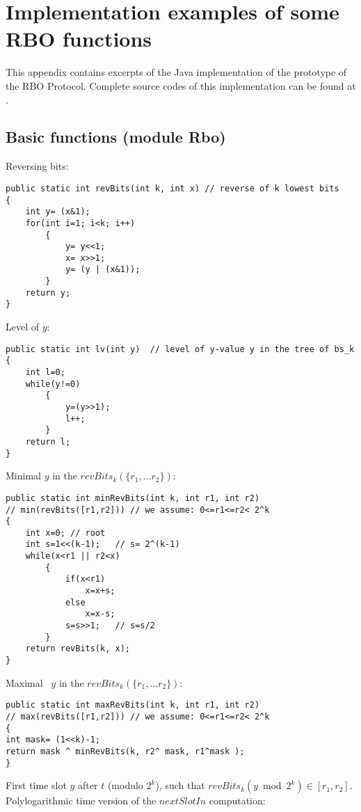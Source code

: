 \appendix

\section{Implementation examples of some RBO functions}
\label{}
This appendix contains excerpts of the Java implementation of the
prototype of the RBO Protocol.
Complete source codes of this implementation can
be found at \cite{RBO-WWW}.
\subsection{Basic functions (module Rbo)}
\label{Rbo-Java}
Reversing bits:
\begin{verbatim}
public static int revBits(int k, int x) // reverse of k lowest bits
{
    int y= (x&1);
    for(int i=1; i<k; i++)
        {
            y= y<<1;
            x= x>>1;
            y= (y | (x&1));
        }
    return y;
}
\end{verbatim}
Level of $y$:
\begin{verbatim}
public static int lv(int y)  // level of y-value y in the tree of bs_k
{
    int l=0;
    while(y!=0) 
        {
            y=(y>>1);
            l++;
        }
    return l;
}
\end{verbatim}
Minimal $y$ in the $revBits_k(\{r_1,\ldots r_2\})$:
\begin{verbatim}
public static int minRevBits(int k, int r1, int r2)
// min(revBits([r1,r2])) // we assume: 0<=r1<=r2< 2^k
{
    int x=0; // root
    int s=1<<(k-1);   // s= 2^(k-1)
    while(x<r1 || r2<x)
        {
            if(x<r1)
                x=x+s;
            else
                x=x-s;
            s=s>>1;   // s=s/2
        }
    return revBits(k, x);
}
\end{verbatim}
Maximal \ $y$ in the $revBits_k(\{r_1,\ldots r_2\})$:
\begin{verbatim}
public static int maxRevBits(int k, int r1, int r2)
// max(revBits([r1,r2])) // we assume: 0<=r1<=r2< 2^k
{
int mask= (1<<k)-1;
return mask ^ minRevBits(k, r2^ mask, r1^mask );
}
\end{verbatim}
First time slot $y$ after $t$ (modulo $2^k$), 
such that $revBits_k(y\bmod 2^k) \in [r_1, r_2]$.
Polylogarithmic time version of the $nextSlotIn$ computation:

